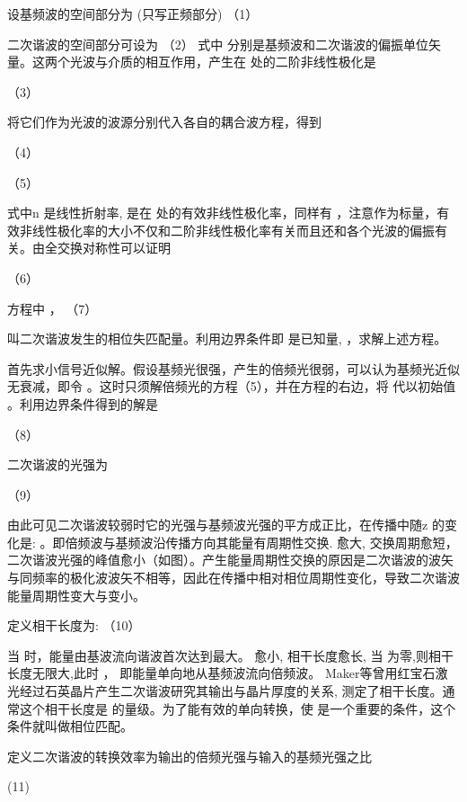 设基频波的空间部分为 (只写正频部分)               （1）

二次谐波的空间部分可设为                                          （2）
式中 分别是基频波和二次谐波的偏振单位矢量。这两个光波与介质的相互作用，产生在 处的二阶非线性极化是

             （3）

将它们作为光波的波源分别代入各自的耦合波方程，得到

                                    （4）

                                    （5）

式中n 是线性折射率,  是在 处的有效非线性极化率，同样有 ，注意作为标量，有效非线性极化率的大小不仅和二阶非线性极化率有关而且还和各个光波的偏振有关。由全交换对称性可以证明

                                           （6）

方程中        ，                                            （7）

叫二次谐波发生的相位失匹配量。利用边界条件即 是已知量,  ，求解上述方程。

首先求小信号近似解。假设基频光很强，产生的倍频光很弱，可以认为基频光近似无衰减，即令 。这时只须解倍频光的方程（5），并在方程的右边，将 代以初始值 。利用边界条件得到的解是

                                            （8）

二次谐波的光强为

                                 （9）

由此可见二次谐波较弱时它的光强与基频波光强的平方成正比，在传播中随z 的变化是:   。即倍频波与基频波沿传播方向其能量有周期性交换.  愈大, 交换周期愈短，二次谐波光强的峰值愈小（如图）。产生能量周期性交换的原因是二次谐波的波矢与同频率的极化波波矢不相等，因此在传播中相对相位周期性变化，导致二次谐波能量周期性变大与变小。
            
     定义相干长度为:
                                              （10）

当 时，能量由基波流向谐波首次达到最大。 愈小, 相干长度愈长,  当 为零,则相干长度无限大,此时 ， 即能量单向地从基频波流向倍频波。  Maker等曾用红宝石激光经过石英晶片产生二次谐波研究其输出与晶片厚度的关系,  测定了相干长度。通常这个相干长度是 的量级。为了能有效的单向转换，使 是一个重要的条件，这个条件就叫做相位匹配。  

                                                      
定义二次谐波的转换效率为输出的倍频光强与输入的基频光强之比

                         (11)

